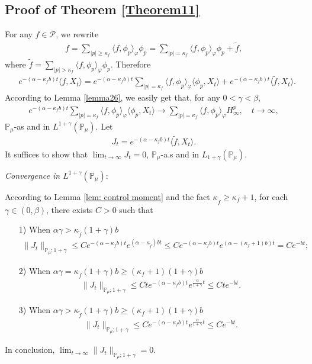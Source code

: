 \documentclass[12pt,oneside,english]{amsart}
\theoremstyle{plain}
\theoremstyle{definition}
\numberwithin{equation}{section}
\begin{document}
\subsection{Proof of Theorem \ref{Theorem11}}
For any $f\in \mathcal{P}$, we rewrite
\begin{align}
    f=\sum_{|p|\geq \kappa_f}\langle f,\phi_p\rangle_\varphi \phi_p=\sum_{|p|= \kappa_f}\langle f,\phi_p\rangle_\varphi \phi_p+\tilde{f},
\end{align}
where $\tilde{f}=\sum_{|p|> \kappa_f}\langle f,\phi_p\rangle_\varphi \phi_p$. Therefore
\begin{align*}
    &e^{-(\alpha-\kappa_fb)t}\langle f,X_t\rangle=
    e^{-(\alpha-\kappa_fb)t}\sum_{|p|= \kappa_f}\langle f,\phi_p\rangle_\varphi \langle \phi_p,X_t\rangle+e^{-(\alpha-\kappa_fb)t} \langle \tilde{f},X_t\rangle.
\end{align*}
According to Lemma \ref{lemma26}, we easily get that,  for any $0< \gamma<\beta$,
\begin{align}\label{as convergence}
     e^{-(\alpha-\kappa_fb)t}\sum_{|p|= \kappa_f}\langle f,\phi_p\rangle_\varphi \langle \phi_p,X_t\rangle \rightarrow \sum_{|p|=\kappa_f}\langle f, \phi_p\rangle_{\varphi} H_{\infty}^p,  \quad  t\rightarrow \infty,
\end{align}
$\mathbb{P}_{\mu}$-as and in $L^{1+\gamma}(\mathbb{P}_{\mu})$. Let
\begin{align}
    J_t=e^{-(\alpha-\kappa_fb)t}\langle \tilde{f},X_t\rangle.
\end{align}
It suffices to show that $\lim_{t\rightarrow \infty}J_t=0$, $\mathbb{P}_{\mu}$-a.s and in $L_{1+\gamma}(\mathbb{P}_{\mu})$.

{\em Convergence in $L^{1+\gamma}(\mathbb{P}_{\mu})$}:

According to  Lemma \ref{lem: control moment} and the fact $\kappa_{\tilde{f}}\geq \kappa_f+1$, for each $\gamma\in(0,\beta)$, there exists $C>0$ such that
\begin{itemize}
    \item [1)] When $\alpha\gamma>\kappa_{\tilde{f}}(1+\gamma)b$
\begin{align*}
    \|J_t\|_{\mathbb{P}_{\mu};1+\gamma}\leq C e^{-(\alpha-\kappa_fb)t}e^{(\alpha-\kappa_{\tilde{f}})bt}\leq C  e^{-(\alpha-\kappa_fb)t}e^{(\alpha-(\kappa_f+1)b)t}=C e^{-bt};
\end{align*}
     \item[2)] When $\alpha\gamma=\kappa_{\tilde{f}}(1+\gamma)b\geq (\kappa_f+1)(1+\gamma)b$
\begin{align*}
     \|J_t\|_{\mathbb{P}_{\mu};1+\gamma}\leq C t e^{-(\alpha-\kappa_fb)t}e^{\frac{\alpha}{1+\gamma}t}\leq C t e^{-bt}.
\end{align*}
     \item[3)] When $\alpha\gamma>\kappa_{\tilde{f}}(1+\gamma)b\geq (\kappa_f+1)(1+\gamma)b$
\begin{align*}
    \|J_t\|_{\mathbb{P}_{\mu};1+\gamma}\leq C e^{-(\alpha-\kappa_fb)t}e^{\frac{\alpha}{1+\gamma}t}\leq C e^{-bt}.
\end{align*}
\end{itemize}
In conclusion, $\lim_{t\rightarrow \infty}\|J_t\|_{\mathbb{P}_{\mu};1+\gamma}=0$.
\end{document}

